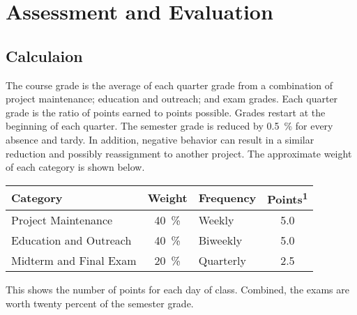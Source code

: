 \documentclass[letterpaper,10pt]{memoir}
\begin{document}
% 


% 

\raggedbottom

\chapter{Assessment and Evaluation}

\section*{Calculaion}


The course grade is the average of each quarter grade from a combination of project maintenance; education and outreach; and exam grades.
%
Each quarter grade is the ratio of points earned to points possible.
%
Grades restart at the beginning of each quarter.
%
The semester grade is reduced by \SI{0.5}{\percent} for every absence and tardy.  In addition, negative behavior can result in a similar reduction and possibly reassignment to another project.
%
The approximate weight of each category is shown below.

	\vspace*{5mm}
	\begin{center}
	{%
		\renewcommand{\arraystretch}{1.35}
		\noindent
		\begin{tabular}{ l c l S }
		Category						&	Weight	&	Frequency	&	{Points\textsuperscript{1}}	\\
		\midrule
		Project Maintenance		&	\SI{40}{\percent} &	Weekly		&	\num{5.0}	\\
		Education and Outreach	&	\SI{40}{\percent}	&	Biweekly 	&	\num{5.0}	\\
		Midterm and Final Exam	&	\SI{20}{\percent}	&	Quarterly	&	\num{2.5}	\\
		\end{tabular}
	}
	\end{center}
	\vspace*{5mm}
	
	\noindent
	This shows the number of points for each day of class.
	Combined, the exams are worth twenty percent of the semester grade.
	
	
	
	\vspace*{5mm}
\end{document}
